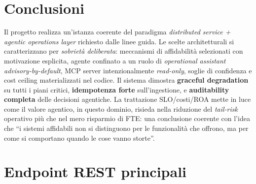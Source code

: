 \documentclass[11pt,a4paper,oneside]{article}
\begin{document}
\section{Conclusioni}
Il progetto realizza un'istanza coerente del paradigma \emph{distributed
service + agentic operations layer} richiesto dalle linee guida. Le scelte
architetturali si caratterizzano per \emph{sobriet\`a deliberata}: meccanismi
di affidabilit\`a selezionati con motivazione esplicita, agente confinato a
un ruolo di \emph{operational assistant} \emph{advisory-by-default}, MCP
server intenzionalmente \emph{read-only}, soglie di confidenza e cost ceiling
materializzati nel codice. Il sistema dimostra
\textbf{graceful degradation} su tutti i piani critici, \textbf{idempotenza
forte} sull'ingestione, e \textbf{auditability completa} delle decisioni
agentiche. La trattazione SLO/costi/ROA mette in luce come il valore
agentico, in questo dominio, risieda nella riduzione del \emph{tail-risk}
operativo pi\`u che nel mero risparmio di FTE: una conclusione coerente con
l'idea che ``i sistemi affidabili non si distinguono per le funzionalit\`a
che offrono, ma per come si comportano quando le cose vanno storte''.

\appendix
\section{Endpoint REST principali}
\end{document}
